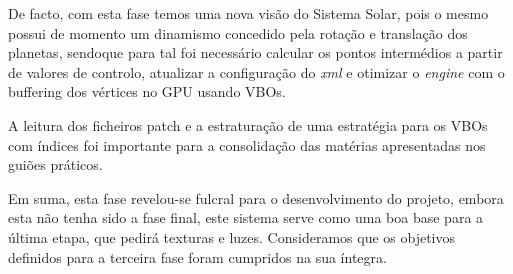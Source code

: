 \documentclass[11pt,a4paper]{report}
\begin{document}
De facto, com esta fase temos uma nova visão do Sistema Solar, pois o mesmo possui de momento um dinamismo concedido pela rotação e translação dos planetas, sendoque para tal foi necessário calcular os pontos intermédios a partir de valores de controlo, atualizar a configuração do \emph{xml} e otimizar o \emph{engine} com o buffering dos vértices no GPU usando VBOs.

A leitura dos ficheiros patch e a estraturação de uma estratégia para os VBOs com índices foi importante para a consolidação das matérias apresentadas nos guiões práticos.

Em suma, esta fase revelou-se fulcral para o desenvolvimento do projeto, embora esta não tenha sido a fase final, este sistema serve como uma boa base para a última etapa, que pedirá texturas e luzes. Consideramos que os objetivos definidos para a terceira fase foram cumpridos na sua íntegra.
\end{document}
